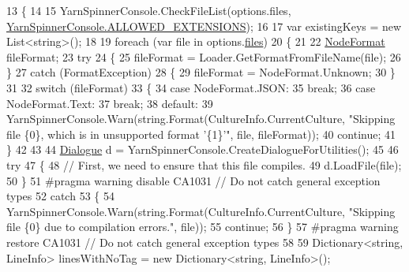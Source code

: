 \begin{DoxyCode}
13         \{
14 
15             YarnSpinnerConsole.CheckFileList(options.files, 
      \hyperlink{a00195_a0979de7ea02c8c0375b8220a12e6575e}{YarnSpinnerConsole.ALLOWED\_EXTENSIONS});
16 
17             var existingKeys = \textcolor{keyword}{new} List<string>();
18 
19             \textcolor{keywordflow}{foreach} (var file \textcolor{keywordflow}{in} options.\hyperlink{a00041_aa93cbb1bc1d5328e0a417012621e92d2}{files})
20             \{
21 
22                 \hyperlink{a00051_ad7ebb46e7309ead8767383a672b3272f}{NodeFormat} fileFormat;
23                 \textcolor{keywordflow}{try}
24                 \{
25                     fileFormat = Loader.GetFormatFromFileName(file);
26                 \}
27                 \textcolor{keywordflow}{catch} (FormatException)
28                 \{
29                     fileFormat = NodeFormat.Unknown;
30                 \}
31 
32                 \textcolor{keywordflow}{switch} (fileFormat)
33                 \{
34                     \textcolor{keywordflow}{case} NodeFormat.JSON:
35                         \textcolor{keywordflow}{break};
36                     \textcolor{keywordflow}{case} NodeFormat.Text:
37                         \textcolor{keywordflow}{break};
38                     \textcolor{keywordflow}{default}:
39                         YarnSpinnerConsole.Warn(string.Format(CultureInfo.CurrentCulture, \textcolor{stringliteral}{"Skipping file
       \{0\}, which is in unsupported format '\{1\}'"}, file, fileFormat));
40                         \textcolor{keywordflow}{continue};
41                 \}
42 
43 
44                 \hyperlink{a00092}{Dialogue} d = YarnSpinnerConsole.CreateDialogueForUtilities();
45 
46                 \textcolor{keywordflow}{try}
47                 \{
48                     \textcolor{comment}{// First, we need to ensure that this file compiles.}
49                     d.LoadFile(file);
50                 \}
51 \textcolor{preprocessor}{#pragma warning disable CA1031 // Do not catch general exception types}
52 \textcolor{preprocessor}{}                \textcolor{keywordflow}{catch}
53                 \{
54                     YarnSpinnerConsole.Warn(string.Format(CultureInfo.CurrentCulture, \textcolor{stringliteral}{"Skipping file \{0\}
       due to compilation errors."}, file));
55                     \textcolor{keywordflow}{continue};
56                 \}
57 \textcolor{preprocessor}{#pragma warning restore CA1031 // Do not catch general exception types}
58 \textcolor{preprocessor}{}
59                 Dictionary<string, LineInfo> linesWithNoTag = \textcolor{keyword}{new} Dictionary<string, LineInfo>();

\end{DoxyCode}
